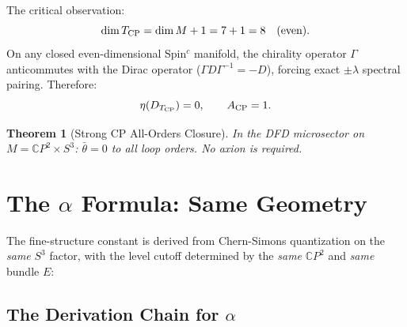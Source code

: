 \documentclass[11pt]{article}
\newtheorem{theorem}{Theorem}
\theoremstyle{remark}
\begin{document}
The critical observation:
\begin{equation}
\dim T_{\rm CP} = \dim M + 1 = 7 + 1 = 8 \quad\text{(even)}.
\end{equation}
On any closed even-dimensional Spin$^c$ manifold, the chirality operator
$\Gamma$ anticommutes with the Dirac operator ($\Gamma D \Gamma^{-1} = -D$),
forcing exact $\pm\lambda$ spectral pairing.  Therefore:
\begin{equation}
\eta(D_{T_{\rm CP}}) = 0, \qquad A_{\rm CP} = 1.
\end{equation}

\begin{theorem}[Strong CP All-Orders Closure]
In the DFD microsector on $M = \mathbb{C}P^2 \times S^3$:
$\bar\theta = 0$ to all loop orders.  No axion is required.
\end{theorem}

\section{The $\alpha$ Formula: Same Geometry}

The fine-structure constant is derived from Chern-Simons quantization on the
\emph{same} $S^3$ factor, with the level cutoff determined by the \emph{same}
$\mathbb{C}P^2$ and \emph{same} bundle $E$:

\subsection{The Derivation Chain for $\alpha$}
\end{document}
